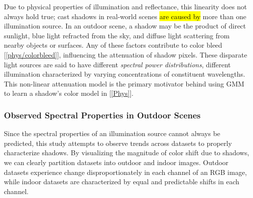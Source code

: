 Due to physical properties of illumination and reflectance, this linearity does not always hold true; cast shadows in real-world scenes \hl{are caused by} more than one illumination source. In an outdoor scene, a shadow may be the product of direct sunlight, blue light refracted from the sky, and diffuse light scattering from nearby objects or surfaces. Any of these factors contribute to color bleed [\ref{phys/colorbleed}], influencing the attenuation of shadow pixels. These disparate light sources are said to have different \textit{spectral power distributions}, different illumination characterized by varying concentrations of constituent wavelengths. This non-linear attenuation model is the primary motivator behind using GMM to learn a shadow's color model in [\ref{Phys}].

\subsubsection{Observed Spectral Properties in Outdoor Scenes} \label{section:spectralprop}

Since the spectral properties of an illumination source cannot always be predicted, this study attempts to observe trends across datasets to properly characterize shadows. By visualizing the magnitude of color shift due to shadows, we can clearly partition datasets into outdoor and indoor images. Outdoor datasets experience change disproportionately in each channel of an RGB image, while indoor datasets are characterized by equal and predictable shifts in each channel.

